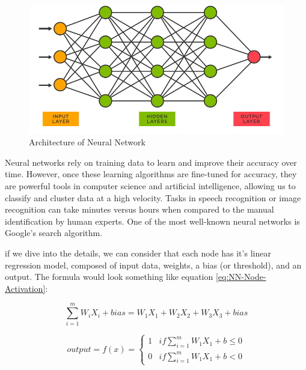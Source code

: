 \begin{figure}[H]
\centering
\includegraphics[width=\linewidth]{../images/neural-network-diagram.png}
\caption{Architecture of Neural Network}
\label{fig:NN}
\end{figure}

Neural networks rely on training data to learn and improve their accuracy over time. However, once these learning algorithms are fine-tuned for accuracy, they are powerful tools in computer science and artificial intelligence, allowing us to classify and cluster data at a high velocity. Tasks in speech recognition or image recognition can take minutes versus hours when compared to the manual identification by human experts. One of the most well-known neural networks is Google’s search algorithm.

if we dive into the details, we can consider that each node has it's linear regression model, composed of input data, weights, a bias (or threshold), and an output. The formula would look something like equation \ref{eq:NN-Node-Activation}:


\begin{equation}
    \sum_{i=1}^{m} W_{i}X_{i} + bias = W_{1}X_{1} + W_{2}X_{2} + W_{3}X_{3} + bias
    \label{eq:NN-Node-Activation}
\end{equation}

\begin{equation}
    output = f(x) = 
    \begin{cases}
        1 & if \sum_{i=1}^{m} W_{1}X_{1} + b \leq 0 \\
        0 & if \sum_{i=1}^{m} W_{1}X_{1} + b < 0
    \end{cases}
    \label{eq:NN-Node-Activation2}
\end{equation}

